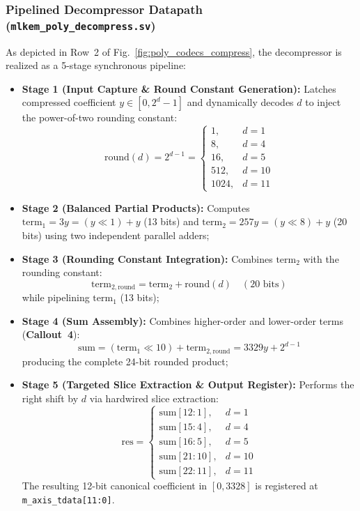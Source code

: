 \subsubsection{Pipelined Decompressor Datapath (\texttt{mlkem\_poly\_decompress.sv})}
As depicted in Row~2 of Fig.~\ref{fig:poly_codecs_compress}, the decompressor is realized as a 5-stage synchronous pipeline:
\begin{itemize}
    \item \textbf{Stage 1 (Input Capture \& Round Constant Generation):} Latches compressed coefficient $y \in [0, 2^d - 1]$ and dynamically decodes $d$ to inject the power-of-two rounding constant:
    \begin{equation}
    \text{round}(d) = 2^{d-1} = \begin{cases} 1, & d = 1 \\ 8, & d = 4 \\ 16, & d = 5 \\ 512, & d = 10 \\ 1024, & d = 11 \end{cases}
    \end{equation}
    \item \textbf{Stage 2 (Balanced Partial Products):} Computes $\text{term}_1 = 3y = (y \ll 1) + y$ (13 bits) and $\text{term}_2 = 257y = (y \ll 8) + y$ (20 bits) using two independent parallel adders;
    \item \textbf{Stage 3 (Rounding Constant Integration):} Combines $\text{term}_2$ with the rounding constant:
    \begin{equation}
    \text{term}_{2,\text{round}} = \text{term}_2 + \text{round}(d) \quad (20\text{ bits})
    \end{equation}
    while pipelining $\text{term}_1$ (13 bits);
    \item \textbf{Stage 4 (Sum Assembly):} Combines higher-order and lower-order terms (\textbf{Callout~4}):
    \begin{equation}
    \text{sum} = (\text{term}_1 \ll 10) + \text{term}_{2,\text{round}} = 3329y + 2^{d-1}
    \end{equation}
    producing the complete 24-bit rounded product;
    \item \textbf{Stage 5 (Targeted Slice Extraction \& Output Register):} Performs the right shift by $d$ via hardwired slice extraction:
    \begin{equation}
    \text{res} = \begin{cases} 
    \text{sum}[12:1], & d = 1 \\ 
    \text{sum}[15:4], & d = 4 \\ 
    \text{sum}[16:5], & d = 5 \\ 
    \text{sum}[21:10], & d = 10 \\ 
    \text{sum}[22:11], & d = 11 
    \end{cases}
    \end{equation}
    The resulting 12-bit canonical coefficient in $[0, 3328]$ is registered at \texttt{m\_axis\_tdata[11:0]}.
\end{itemize}

